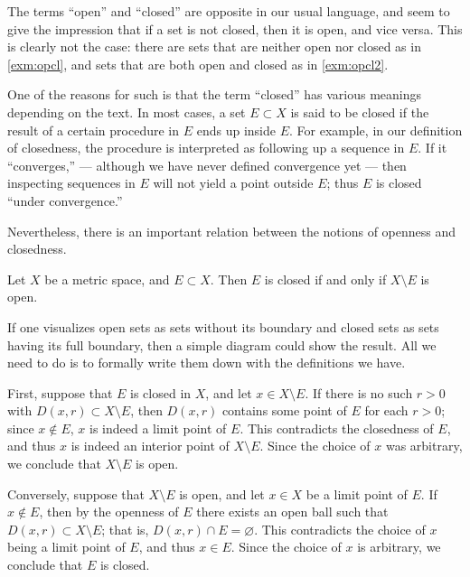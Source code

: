 The terms ``open'' and ``closed'' are opposite in our usual language,
and seem to give the impression that
if a set is not closed, then it is open, and vice versa.
This is clearly not the case:
there are sets that are neither open nor closed as in \cref{exm:opcl},
and sets that are both open and closed as in \cref{exm:opcl2}.

One of the reasons for such is that
the term ``closed'' has various meanings depending on the text.
In most cases,
a set \(E\subset X\) is said to be closed
if the result of a certain procedure in \(E\) ends up inside \(E\).
For example, in our definition of closedness,
the procedure is interpreted as following up a sequence in \(E\).
If it ``converges,''
--- although we have never defined convergence yet ---
then inspecting sequences in \(E\) will not yield a point outside \(E\);
thus \(E\) is closed ``under convergence.''

Nevertheless, there is an important relation
between the notions of openness and closedness.

\begin{proposition}
    \label{prop:opclcompl}
    Let \(X\) be a metric space, and \(E\subset X\).
    Then \(E\) is closed if and only if \(X\setminus E\) is open.
\end{proposition}
\begin{sketch}
    If one visualizes open sets as sets without its boundary
    and closed sets as sets having its full boundary,
    then a simple diagram could show the result.
    All we need to do is
    to formally write them down with the definitions we have.
\end{sketch}
\begin{myproof}
    First, suppose that \(E\) is closed in \(X\),
    and let \(x\in X\setminus E\).
    If there is no such \(r>0\) with \(D(x,r)\subset X\setminus E\),
    then \(D(x,r)\) contains some point of \(E\) for each \(r>0\);
    since \(x\notin E\), \(x\) is indeed a limit point of \(E\).
    This contradicts the closedness of \(E\),
    and thus \(x\) is indeed an interior point of \(X\setminus E\).
    Since the choice of \(x\) was arbitrary,
    we conclude that \(X\setminus E\) is open.

    Conversely, suppose that \(X\setminus E\) is open,
    and let \(x\in X\) be a limit point of \(E\).
    If \(x\notin E\),
    then by the openness of \(E\) there exists an open ball such that
    \(D(x,r)\subset X\setminus E\);
    that is, \(D(x,r)\cap E=\varnothing\).
    This contradicts the choice of \(x\) being a limit point of \(E\),
    and thus \(x\in E\).
    Since the choice of \(x\) is arbitrary,
    we conclude that \(E\) is closed.
\end{myproof}


